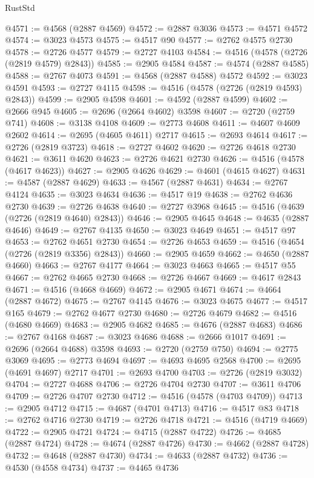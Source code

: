 \begin{lexlean}{RustStd}
\begin{coremodule}
@4571 := @4568 (@2887 @4569)
@4572 := @2887 @3036
@4573 := @4571 @4572
@4574 := @3023 @4573
@4575 := @4517 @90
@4577 := @2762 @4575 @2730
@4578 := @2726 @4577
@4579 := @2727 @4103
@4584 := @4516 (@4578 (@2726 (@2819 @4579) @2843))
@4585 := @2905 @4584
@4587 := @4574 (@2887 @4585)
@4588 := @2767 @4073
@4591 := @4568 (@2887 @4588) @4572
@4592 := @3023 @4591
@4593 := @2727 @4115
@4598 := @4516 (@4578 (@2726 (@2819 @4593) @2843))
@4599 := @2905 @4598
@4601 := @4592 (@2887 @4599)
@4602 := @2666 @945
@4605 := @2696 (@2664 @4602) @3598
@4607 := @2720 (@2759 @741)
@4608 := @3138 @4108
@4609 := @2773 @4608
@4611 := @4607 @4609 @2602
@4614 := @2695 (@4605 @4611) @2717
@4615 := @2693 @4614
@4617 := @2726 (@2819 @3723)
@4618 := @2727 @4602
@4620 := @2726 @4618 @2730
@4621 := @3611 @4620
@4623 := @2726 @4621 @2730
@4626 := @4516 (@4578 (@4617 @4623))
@4627 := @2905 @4626
@4629 := @4601 (@4615 @4627)
@4631 := @4587 (@2887 @4629)
@4633 := @4567 (@2887 @4631)
@4634 := @2767 @4124
@4635 := @3023 @4634
@4636 := @4517 @19
@4638 := @2762 @4636 @2730
@4639 := @2726 @4638
@4640 := @2727 @3968
@4645 := @4516 (@4639 (@2726 (@2819 @4640) @2843))
@4646 := @2905 @4645
@4648 := @4635 (@2887 @4646)
@4649 := @2767 @4135
@4650 := @3023 @4649
@4651 := @4517 @97
@4653 := @2762 @4651 @2730
@4654 := @2726 @4653
@4659 := @4516 (@4654 (@2726 (@2819 @3356) @2843))
@4660 := @2905 @4659
@4662 := @4650 (@2887 @4660)
@4663 := @2767 @4177
@4664 := @3023 @4663
@4665 := @4517 @55
@4667 := @2762 @4665 @2730
@4668 := @2726 @4667
@4669 := @4617 @2843
@4671 := @4516 (@4668 @4669)
@4672 := @2905 @4671
@4674 := @4664 (@2887 @4672)
@4675 := @2767 @4145
@4676 := @3023 @4675
@4677 := @4517 @165
@4679 := @2762 @4677 @2730
@4680 := @2726 @4679
@4682 := @4516 (@4680 @4669)
@4683 := @2905 @4682
@4685 := @4676 (@2887 @4683)
@4686 := @2767 @4168
@4687 := @3023 @4686
@4688 := @2666 @1017
@4691 := @2696 (@2664 @4688) @3598
@4693 := @2720 (@2759 @750)
@4694 := @2775 @3069
@4695 := @2773 @4694
@4697 := @4693 @4695 @2568
@4700 := @2695 (@4691 @4697) @2717
@4701 := @2693 @4700
@4703 := @2726 (@2819 @3032)
@4704 := @2727 @4688
@4706 := @2726 @4704 @2730
@4707 := @3611 @4706
@4709 := @2726 @4707 @2730
@4712 := @4516 (@4578 (@4703 @4709))
@4713 := @2905 @4712
@4715 := @4687 (@4701 @4713)
@4716 := @4517 @83
@4718 := @2762 @4716 @2730
@4719 := @2726 @4718
@4721 := @4516 (@4719 @4669)
@4722 := @2905 @4721
@4724 := @4715 (@2887 @4722)
@4726 := @4685 (@2887 @4724)
@4728 := @4674 (@2887 @4726)
@4730 := @4662 (@2887 @4728)
@4732 := @4648 (@2887 @4730)
@4734 := @4633 (@2887 @4732)
@4736 := @4530 (@4558 @4734)
@4737 := @4465 @4736

\end{coremodule}
\end{lexlean}
